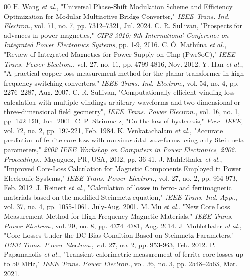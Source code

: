 \documentclass[conference]{IEEEtran}
\begin{document}
\begin{thebibliography}{00}
 H. Wang \textit{et al.}, "Universal Phase-Shift Modulation Scheme and Efficiency Optimization for Modular Multiactive Bridge Converter,"  \textit{IEEE Trans. Ind. Electron.}, vol. 71, no. 7, pp. 7312–7321, Jul. 2024.
 C. R. Sullivan, "Prospects for advances in power magnetics," \textit{CIPS 2016; 9th International Conference on Integrated Power Electronics Systems}, pp. 1-9, 2016.
 C. Ó. Mathúna \textit{et al.}, "Review of Integrated Magnetics for Power Supply on Chip (PwrSoC)," \textit{IEEE Trans. Power Electron.}, vol. 27, no. 11, pp. 4799-4816, Nov. 2012.
 Y. Han \textit{et al.}, "A practical copper loss measurement method for the planar transformer in high-frequency switching converters," \textit{IEEE Trans. Ind. Electron.}, vol. 54, no. 4, pp. 2276–2287, Aug. 2007.
 C. R. Sullivan, "Computationally efficient winding loss calculation with multiple windings arbitrary waveforms and two-dimensional or three-dimensional field geometry", \textit{IEEE Trans. Power Electron.}, vol. 16, no. 1, pp. 142-150, Jan. 2001.
 C. P. Steinmetz, "On the law of hysteresis," \textit{Proc. IEEE}, vol. 72, no. 2, pp. 197-221, Feb. 1984.
 K. Venkatachalam \textit{et al.}, "Accurate prediction of ferrite core loss with nonsinusoidal waveforms using only Steinmetz parameters," \textit{2002 IEEE Workshop on Computers in Power Electronics, 2002. Proceedings.}, Mayaguez, PR, USA, 2002, pp. 36-41.
 J. Muhlethaler \textit{et al.}, "Improved Core-Loss Calculation for Magnetic Components Employed in Power Electronic Systems," \textit{IEEE Trans. Power Electron.}, vol. 27, no. 2, pp. 964-973, Feb. 2012.
 J. Reinert \textit{et al.}, "Calculation of losses in ferro- and ferrimagnetic materials based on the modified Steinmetz equation," \textit{IEEE Trans. Ind. Appl.}, vol. 37, no. 4, pp. 1055-1061, July-Aug. 2001.
 M. Mu \textit{et al.}, "New Core Loss Measurement Method for High-Frequency Magnetic Materials," \textit{IEEE Trans. Power Electron.}, vol. 29, no. 8, pp. 4374–4381, Aug. 2014.
 J. Muhlethaler \textit{et al.}, "Core Losses Under the DC Bias Condition Based on Steinmetz Parameters," \textit{IEEE Trans. Power Electron.}, vol. 27, no. 2, pp. 953-963, Feb. 2012.
 P. Papamanolis \textit{et al.}, "Transient calorimetric measurement of ferrite core losses up to 50 MHz," \textit{IEEE Trans. Power Electron.}, vol. 36, no. 3, pp. 2548–2563, Mar. 2021.

\end{thebibliography}
\end{document}
